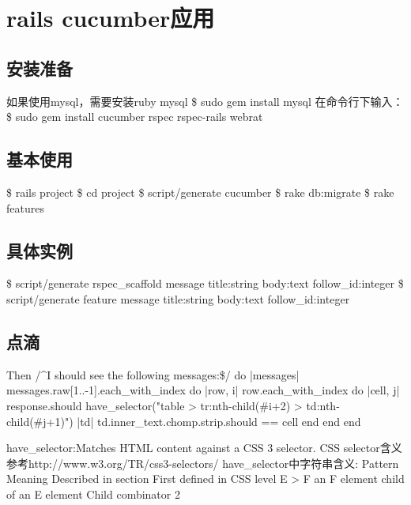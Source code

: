 
\chapter{rails cucumber应用}

\section{安装准备}
如果使用mysql，需要安装ruby mysql
\$ sudo gem install mysql
在命令行下输入：
\$ sudo gem install cucumber rspec rspec-rails webrat

\section{基本使用}
\$ rails project
\$ cd project
\$ script/generate cucumber
\$ rake db:migrate
\$ rake features

\section{具体实例}
\$ script/generate rspec_scaffold message title:string body:text follow_id:integer 
\$ script/generate feature  message title:string body:text follow_id:integer 

\section{点滴}
Then /^I should see the following messages:\$/ do |messages|
  messages.raw[1..-1].each_with_index do |row, i|
    row.each_with_index do |cell, j|
      response.should have_selector("table > tr:nth-child(#{i+2}) > td:nth-child(#{j+1})") { |td|
        td.inner_text.chomp.strip.should == cell
      }
    end
  end
end

have_selector:Matches HTML content against a CSS 3 selector. 
CSS selector含义参考http://www.w3.org/TR/css3-selectors/
have_selector中字符串含义:
Pattern  	Meaning  				Described in section  	First defined in CSS level
E > F  		an F element child of an E element  	Child combinator  	2

